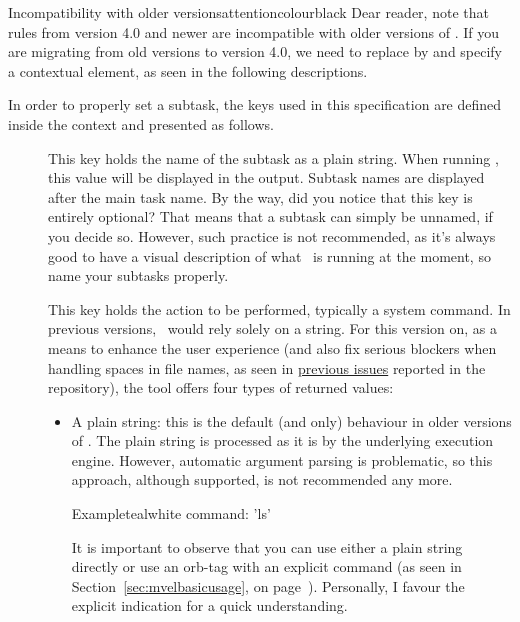 \begin{description}
\begin{messagebox}{Incompatibility with older versions}{attentioncolour}{\icerror}{black}
Dear reader, note that rules from version 4.0 and newer are incompatible with older versions of \arara. If you are migrating from old versions to version 4.0, we need to replace  by  and specify a contextual element, as seen in the following descriptions.
\end{messagebox}

In order to properly set a subtask, the keys used in this specification are defined inside the  context and presented as follows.

\begin{description}
\item[] This key holds the name of the subtask as a plain string. When running \arara, this value will be displayed in the output. Subtask names are displayed after the main task name. By the way, did you notice that this key is entirely optional? That means that a subtask can simply be unnamed, if you decide so. However, such practice is not recommended, as it's always good to have a visual description of what \arara\ is running at the moment, so name your subtasks properly.

\item[] This key holds the action to be performed, typically a system command. In previous versions, \arara\ would rely solely on a string. For this version on, as a means to enhance the user experience (and also fix serious blockers when handling spaces in file names, as seen in \href{https://github.com/cereda/arara/issues}{previous issues} reported in the repository), the tool offers four types of returned values:

\begin{itemize}[label={--}]
\item A plain string: this is the default (and only) behaviour in older versions of \arara. The plain string is processed as it is by the underlying execution engine. However, automatic argument parsing is problematic, so this approach, although supported, is not recommended any more.

\begin{codebox}{Example}{teal}{\icnote}{white}
command: 'ls'
\end{codebox}

It is important to observe that you can use either a plain string directly or use an \gls{orb-tag} with an explicit  command (as seen in Section~\ref{sec:mvelbasicusage}, on page~\pageref{sec:mvelbasicusage}). Personally, I favour the explicit indication for a quick understanding.


\end{itemize}
\end{description}
\end{description}
